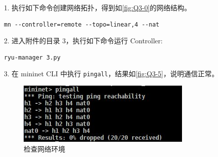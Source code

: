 \documentclass[format=draft,language=chinese,category=SDN]{hustreport}
\newcommand{\code}{\texttt}
\begin{document}
1. 执行如下命令创建网络拓扑，得到如\autoref{fig:Q3-0}的网络结构。
\begin{lstlisting}
mn --controller=remote --topo=linear,4 --nat
\end{lstlisting}

2. 进入附件的目录 3，执行如下命令运行 Controller:
\begin{lstlisting}
ryu-manager 3.py
\end{lstlisting}

3. 在 mininet CLI 中执行 \code{pingall}，结果如\autoref{fig:Q3-5}，说明通信正常。

\begin{figure}[!h]
\centering
\includegraphics[width=.5\textwidth]{fig/3_5}
\caption{检查网络环境}\label{fig:Q3-5}
\end{figure}
\end{document}
